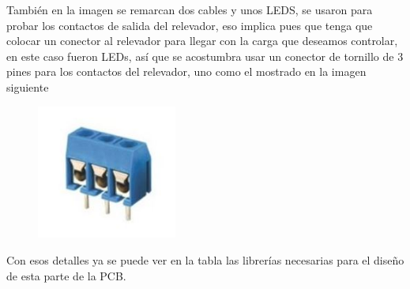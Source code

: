 \documentclass[12pt]{article}
\begin{document}
\par

También en la imagen se remarcan dos cables y unos LEDS, se usaron para probar los contactos de salida del relevador,  eso implica pues que tenga que colocar un conector al relevador para llegar con la carga que deseamos controlar, en este caso fueron LEDs, así que se acostumbra usar un conector de tornillo de 3 pines para los contactos del relevador, uno como el mostrado en la imagen siguiente\par




\begin{figure}[H]
	\begin{Center}
		\includegraphics[width=1.81in,height=1.74in]{./media/image20.jpeg}
	\end{Center}
\end{figure}



\par

Con esos detalles ya se puede ver en la tabla las librerías necesarias para el diseño de esta parte de la PCB.\par



\end{document}
